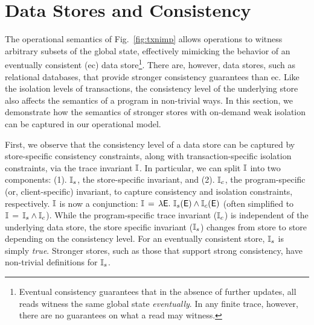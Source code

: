 \section{Data Stores and Consistency}
\label{sec:store-consistency}

The operational semantics of Fig.~\ref{fig:txnimp} allows operations
to witness arbitrary subsets of the global state, effectively mimicking the
behavior of an eventually consistent ({\sc ec}) data
store\footnote{Eventual consistency guarantees that in the absence of further
  updates, all reads witness the same global state
  \emph{eventually}. In any finite trace, however, there are no
  guarantees on what a read may witness.}. There are, however, data stores,
such as relational databases, that provide stronger consistency
guarantees than {\sc ec}. Like the isolation levels of transactions,
the consistency level of the underlying store also affects the
semantics of a program in non-trivial ways. In this section, we
demonstrate how the semantics of stronger stores with on-demand weak
isolation can be captured in our operational model. 


First, we observe that the consistency level of a data store can be
captured by store-specific consistency constraints, along with
transaction-specific isolation constraints, via the trace invariant
$\mathbb{I}$. In particular, we can split $\mathbb{I}$ into two components: (1).
$\mathbb{I}_s$, the store-specific invariant, and (2). $\mathbb{I}_c$, the
program-specific (or, client-specific) invariant, to capture
consistency and isolation constraints, respectively.  $\mathbb{I}$ is now a
conjunction: $\mathbb{I} \,=\, \lambda\textsf{E}.~\mathbb{I}_s(\textsf{E}) \wedge \mathbb{I}_c(\textsf{E})$ (often
simplified to $\mathbb{I} \,=\, \mathbb{I}_s\wedge\mathbb{I}_c$).  While the program-specific
trace invariant ($\mathbb{I}_c$) is independent of the underlying data store,
the store specific invariant ($\mathbb{I}_s$) changes from store to store
depending on the consistency level.  For an eventually consistent
store, $\mathbb{I}_s$ is simply \emph{true}. Stronger stores, such as those
that support strong consistency, have non-trivial definitions for
$\mathbb{I}_s$.

